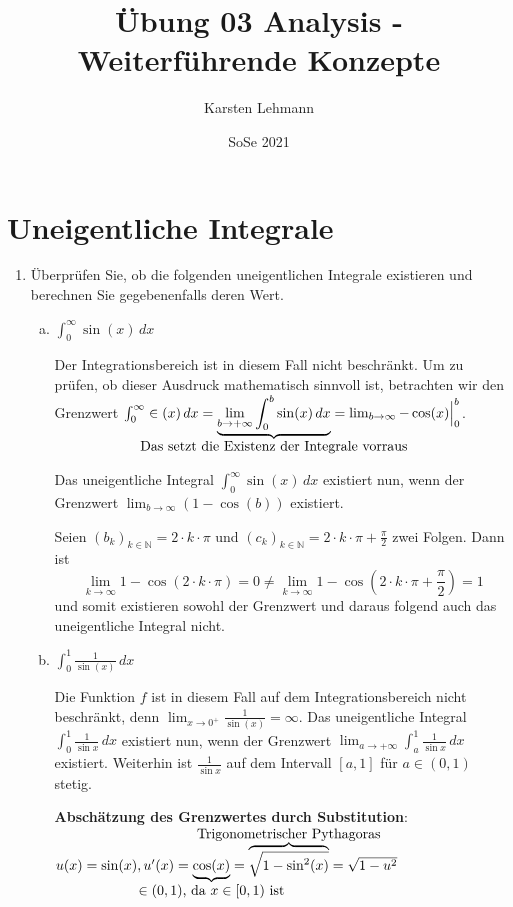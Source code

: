 \documentclass{article}
\author{Karsten Lehmann}
\date{SoSe 2021}
\title{Übung 03 Analysis - Weiterführende Konzepte}
\begin{document}
\section*{Uneigentliche Integrale}

\begin{enumerate}[1.]
\item Überprüfen Sie, ob die folgenden uneigentlichen Integrale existieren und
  berechnen Sie gegebenenfalls deren Wert.
  
  \begin{enumerate}[a)]
  \item $\int_0^{\infty} \sin(x)\,dx$

    Der Integrationsbereich ist in diesem Fall nicht beschränkt.
    Um zu prüfen, ob dieser Ausdruck mathematisch sinnvoll ist,
    betrachten wir den Grenzwert
    $\int_0^{\infty} \in(x) \,dx = \underset{\makebox[0pt]{Das setzt die Existenz der Integrale vorraus}}{
      \underbrace{\lim_{b \to +\infty} \int_0^b \sin(x) \,dx}} =
    \lim_{b \to \infty} - \cos(x) {\Big |}_0^b$.

    Das uneigentliche Integral $\int_0^{\infty} \sin(x)\,dx$ existiert nun, wenn
    der Grenzwert $\lim_{b \to \infty} (1 - \cos(b))$ existiert.

    Seien $(b_k)_{k \in \mathbb{N}} = 2 \cdot k \cdot \pi$ und
    $(c_k)_{k \in \mathbb{N}} = 2 \cdot k \cdot \pi + \frac{\pi}{2}$
    zwei Folgen.
    Dann ist
    \[
      \lim_{k \to \infty} 1 - \cos(2 \cdot k \cdot \pi) = 0 \ne
      \lim_{k \to \infty} 1 - \cos\left( 2 \cdot k \cdot \pi + \frac{\pi}{2} \right) = 1
    \]
    und somit existieren sowohl der Grenzwert und daraus folgend auch das
    uneigentliche Integral nicht.

  \item $\int_0^1 \frac{1}{\sin(x)} \,dx$

    Die Funktion $f$ ist in diesem Fall auf dem Integrationsbereich
    nicht beschränkt, denn $\lim_{x \to 0^+} \frac{1}{\sin(x)} = \infty$.
    Das uneigentliche Integral $\int_0^1 \frac{1}{\sin x}\,dx$ existiert nun,
    wenn der Grenzwert $\lim_{a \to +\infty} \int_a^1 \frac{1}{\sin x}\,dx$
    existiert.
    Weiterhin ist $\frac{1}{\sin x}$ auf dem Intervall $[a, 1]$ für
    $a \in (0, 1)$ stetig.

    \textbf{Abschätzung des Grenzwertes durch Substitution}:
    $u(x) = \sin(x), u'(x) =
    \underset{\makebox[0pt]{$\in (0, 1)$, da $x \in [0, 1)$ ist}}{\underbrace{\cos(x)}} =
    \overset{\makebox[0pt]{Trigonometrischer Pythagoras}}{\overbrace{\sqrt{1 - \sin^2(x)}}}
    = \sqrt{1 - u^2}$


\end{enumerate}
\end{enumerate}
\end{document}

